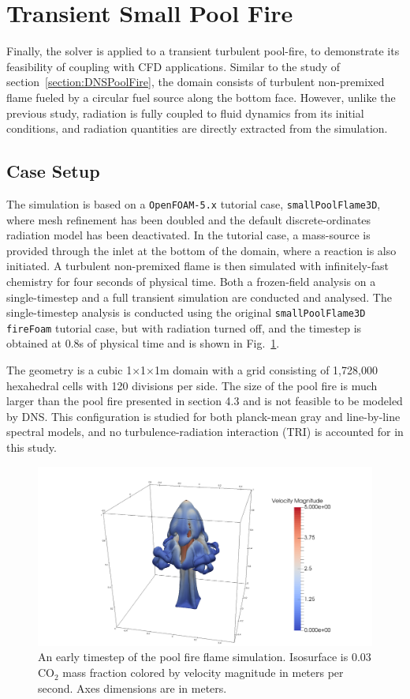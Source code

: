 \section{Transient Small Pool Fire}\label{section:SmallPoolFlame}
Finally, the solver is applied to a transient turbulent pool-fire, to demonstrate its feasibility of coupling with CFD applications. Similar to the study of section~\ref{section:DNSPoolFire}, the domain consists of turbulent non-premixed flame fueled by a circular fuel source along the bottom face. However, unlike the previous study, radiation is fully coupled to fluid dynamics from its initial conditions, and radiation quantities are directly extracted from the simulation. 

\subsection{Case Setup}
The simulation is based on a \verb|OpenFOAM-5.x| tutorial case, \texttt{smallPoolFlame3D}, where mesh refinement has been doubled and the default discrete-ordinates radiation model has been deactivated. 
In the tutorial case, a mass-source is provided through the inlet at the bottom of the domain, where a reaction is also initiated. A turbulent non-premixed flame is then simulated with infinitely-fast chemistry for four seconds of physical time.
Both a frozen-field analysis on a single-timestep and a full transient simulation are conducted and analysed. The single-timestep analysis is conducted using the original \texttt{smallPoolFlame3D} \verb|fireFoam| tutorial case, but with radiation turned off, and the timestep is obtained at 0.8s of physical time and is shown in Fig.~\ref{fig:PoolFire_diagram}.

The geometry is a cubic 1$\times$1$\times$1m domain with a grid consisting of 1,728,000 hexahedral cells with 120 divisions per side.
The size of the pool fire is much larger than the pool fire presented in section 4.3 and is not feasible to be modeled by DNS.
This configuration is studied for both planck-mean gray and line-by-line spectral models, and no turbulence-radiation interaction (TRI) is accounted for in this study. %

\begin{figure}
\includegraphics[width=\linewidth]{figures/ch4/contour_early.png}
\caption{An early timestep of the pool fire flame simulation. Isosurface is 0.03 CO$_2$ mass fraction colored by velocity magnitude in meters per second. Axes dimensions are in meters.}
\label{fig:PoolFire_diagram}
\end{figure}

